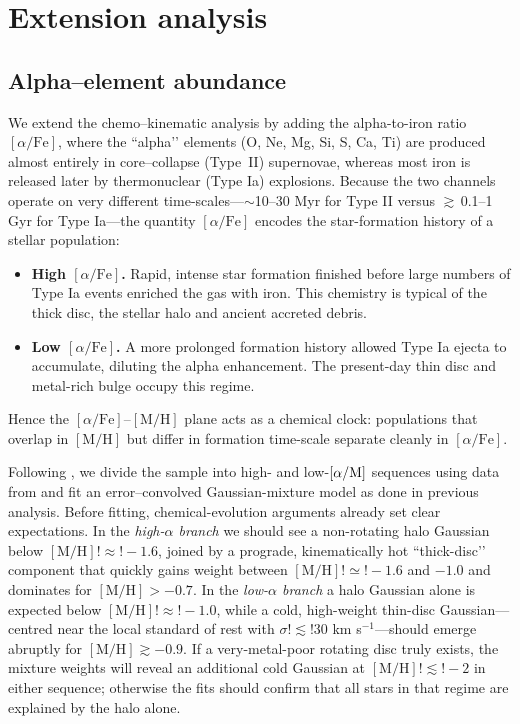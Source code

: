 \documentclass[a4paper,12pt]{article}
\begin{document}
\section{Extension analysis}
\subsection{Alpha–element abundance}\label{subsec:alpha}

We extend the chemo–kinematic analysis by adding the
alpha-to-iron ratio $[\alpha/\mathrm{Fe}]$, where the “alpha’’ elements
(O, Ne, Mg, Si, S, Ca, Ti) are produced almost entirely in core–collapse
(\hbox{Type II}) supernovae, whereas most iron is released later by
thermonuclear (Type Ia) explosions.  Because the two channels operate on
very different time-scales—$\sim$10–30 Myr for Type II versus
$\gtrsim$\,0.1–1 Gyr for Type Ia—the quantity $[\alpha/\mathrm{Fe}]$
encodes the star-formation history of a stellar population:

\begin{itemize}
  \item \textbf{High $[\alpha/\mathrm{Fe}]$.}  
        Rapid, intense star formation finished before large numbers of
        Type Ia events enriched the gas with iron.  This chemistry is
        typical of the thick disc, the stellar halo and ancient accreted
        debris.

  \item \textbf{Low $[\alpha/\mathrm{Fe}]$.}  
        A more prolonged formation history allowed Type Ia ejecta to
        accumulate, diluting the alpha enhancement.  The present-day thin
        disc and metal-rich bulge occupy this regime.
\end{itemize}

Hence the $[\alpha/\mathrm{Fe}]$–$[\mathrm{M/H}]$ plane acts as a chemical
clock: populations that overlap in $[\mathrm{M/H}]$ but differ in formation
time-scale separate cleanly in $[\alpha/\mathrm{Fe}]$.

Following \citet{Vis2024}, we divide the sample into high- and low-$[\alpha/{\rm M}]$ 
sequences using data from \citet{Li2024} and fit an error–convolved Gaussian-mixture model
as done in previous analysis. Before fitting, chemical-evolution 
arguments already set clear expectations. In the \textit{high-$\alpha$ branch} we should 
see a non-rotating halo Gaussian below $[\mathrm{M/H}]!\approx!-1.6$, joined by a 
prograde, kinematically hot “thick-disc’’ component that quickly gains weight between 
$[\mathrm{M/H}]!\simeq!-1.6$ and $-1.0$ and dominates for $[\mathrm{M/H}]>-0.7$. In 
the \textit{low-$\alpha$ branch} a halo Gaussian alone is expected below 
$[\mathrm{M/H}]!\approx!-1.0$, while a cold, high-weight thin-disc Gaussian—centred 
near the local standard of rest with $\sigma!\lesssim!30$ km s$^{-1}$—should emerge 
abruptly for $[\mathrm{M/H}]\gtrsim-0.9$. If a very-metal-poor rotating disc truly 
exists, the mixture weights will reveal an additional cold Gaussian at 
$[\mathrm{M/H}]!\lesssim!-2$ in either sequence; otherwise the fits should confirm that 
all stars in that regime are explained by the halo alone.
\end{document}
